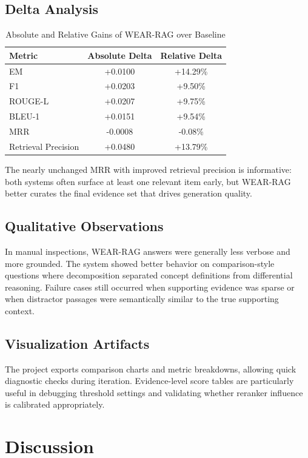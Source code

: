 \documentclass[10pt,draftclsnofoot,onecolumn,journal]{IEEEtran}
\begin{document}
\subsection{Delta Analysis}
\begin{table}[h]
\centering
\caption{Absolute and Relative Gains of WEAR-RAG over Baseline}
\label{tab:delta}
\begin{tabular}{lcc}
\toprule
Metric & Absolute Delta & Relative Delta \\
\midrule
EM & +0.0100 & +14.29\% \\
F1 & +0.0203 & +9.50\% \\
ROUGE-L & +0.0207 & +9.75\% \\
BLEU-1 & +0.0151 & +9.54\% \\
MRR & -0.0008 & -0.08\% \\
Retrieval Precision & +0.0480 & +13.79\% \\
\bottomrule
\end{tabular}
\end{table}

The nearly unchanged MRR with improved retrieval precision is informative: both systems often surface at least one relevant item early, but WEAR-RAG better curates the final evidence set that drives generation quality.

\subsection{Qualitative Observations}
In manual inspections, WEAR-RAG answers were generally less verbose and more grounded. The system showed better behavior on comparison-style questions where decomposition separated concept definitions from differential reasoning. Failure cases still occurred when supporting evidence was sparse or when distractor passages were semantically similar to the true supporting context.

\subsection{Visualization Artifacts}
The project exports comparison charts and metric breakdowns, allowing quick diagnostic checks during iteration. Evidence-level score tables are particularly useful in debugging threshold settings and validating whether reranker influence is calibrated appropriately.

\section{Discussion}
\end{document}
